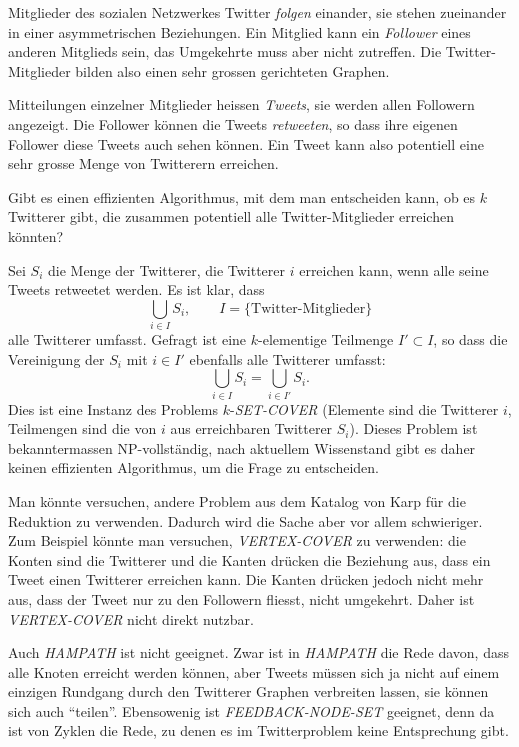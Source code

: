 Mitglieder des sozialen Netzwerkes Twitter {\it folgen} einander,
sie stehen zueinander in einer asymmetrischen Beziehungen. Ein Mitglied
kann ein {\it Follower} eines anderen Mitglieds sein, das Umgekehrte
muss aber nicht zutreffen. Die Twitter-Mitglieder bilden also
einen sehr grossen gerichteten Graphen.

Mitteilungen einzelner Mitglieder heissen {\it Tweets}, sie werden
allen Followern angezeigt. Die Follower können die Tweets {\it retweeten},
so dass ihre eigenen Follower diese Tweets auch sehen können.
Ein Tweet kann also potentiell eine sehr grosse Menge von Twitterern
erreichen.

Gibt es einen effizienten Algorithmus, mit dem man entscheiden kann,
ob es $k$ Twitterer gibt, die zusammen potentiell alle Twitter-Mitglieder
erreichen könnten?


\begin{loesung}
Sei $S_i$ die Menge der Twitterer, die Twitterer $i$ erreichen kann,
wenn alle seine Tweets retweetet werden. Es ist klar, dass
\[
\bigcup_{i\in I}S_i,\qquad I=\{\text{Twitter-Mitglieder}\}
\]
alle Twitterer umfasst. Gefragt ist eine $k$-elementige Teilmenge
$I'\subset I$, so dass die Vereinigung der $S_i$ mit $i\in I'$
ebenfalls alle Twitterer umfasst:
\[
\bigcup_{i\in I}S_i
=
\bigcup_{i\in I'}S_i.
\]
Dies ist eine Instanz des Problems $k$-{\it SET-COVER} (Elemente sind
die Twitterer $i$, Teilmengen sind die von $i$ aus erreichbaren
Twitterer $S_i$). Dieses Problem ist bekanntermassen NP-vollständig,
nach aktuellem Wissenstand gibt es daher keinen effizienten Algorithmus, um
die Frage zu entscheiden.

Man könnte versuchen, andere Problem aus dem Katalog von Karp für
die Reduktion zu verwenden. Dadurch wird die Sache aber vor allem
schwieriger. Zum Beispiel könnte man versuchen, {\it VERTEX-COVER} zu
verwenden: die Konten sind die Twitterer und die Kanten drücken
die Beziehung aus, dass ein Tweet einen Twitterer erreichen kann.
Die Kanten drücken jedoch nicht mehr aus, dass der Tweet nur zu
den Followern fliesst, nicht umgekehrt.
Daher ist {\it VERTEX-COVER} nicht direkt nutzbar.

Auch {\it HAMPATH} ist nicht geeignet.
Zwar ist in {\it HAMPATH} die Rede davon, dass alle Knoten erreicht
werden können, aber Tweets müssen sich ja nicht auf einem einzigen
Rundgang durch den Twitterer Graphen verbreiten lassen, sie können
sich auch ``teilen''. Ebensowenig ist {\it FEEDBACK-NODE-SET}
geeignet, denn da ist von Zyklen die Rede, zu denen es im Twitterproblem
keine Entsprechung gibt.
\end{loesung}
